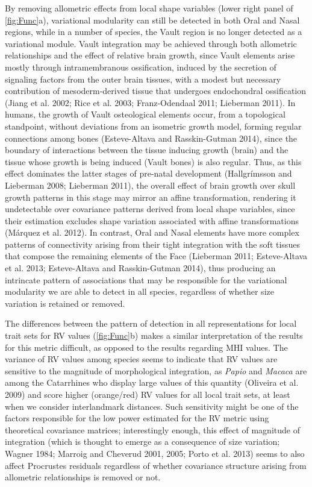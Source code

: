 \documentclass[12pt,]{article}
\begin{document}
By removing allometric effects from local shape variables (lower right
panel of \autoref{fig:Func}a), variational modularity can still be
detected in both Oral and Nasal regions, while in a number of species,
the Vault region is no longer detected as a variational module. Vault
integration may be achieved through both allometric relationships and
the effect of relative brain growth, since Vault elements arise mostly
through intramembranous ossification, induced by the secretion of
signaling factors from the outer brain tissues, with a modest but
necessary contribution of mesoderm-derived tissue that undergoes
endochondral ossification (Jiang et al. 2002; Rice et al. 2003;
Franz-Odendaal 2011; Lieberman 2011). In humans, the growth of Vault
osteological elements occur, from a topological standpoint, without
deviations from an isometric growth model, forming regular connections
among bones (Esteve-Altava and Rasskin-Gutman 2014), since the boundary
of interactions between the tissue inducing growth (brain) and the
tissue whose growth is being induced (Vault bones) is also regular.
Thus, as this effect dominates the latter stages of pre-natal
development (Hallgrímsson and Lieberman 2008; Lieberman 2011), the
overall effect of brain growth over skull growth patterns in this stage
may mirror an affine transformation, rendering it undetectable over
covariance patterns derived from local shape variables, since their
estimation excludes shape variation associated with affine
transformations (Márquez et al. 2012). In contrast, Oral and Nasal
elements have more complex patterns of connectivity arising from their
tight integration with the soft tissues that compose the remaining
elements of the Face (Lieberman 2011; Esteve-Altava et al. 2013;
Esteve-Altava and Rasskin-Gutman 2014), thus producing an intrincate
pattern of associations that may be responsible for the variational
modularity we are able to detect in all species, regardless of whether
size variation is retained or removed.

The differences between the pattern of detection in all representations
for local trait sets for RV values (\autoref{fig:Func}b) makes a similar
interpretation of the results for this metric difficult, as opposed to
the results regarding MHI values. The variance of RV values among
species seems to indicate that RV values are sensitive to the magnitude
of morphological integration, as \emph{Papio} and \emph{Macaca} are
among the Catarrhines who display large values of this quantity
(Oliveira et al. 2009) and score higher (orange/red) RV values for all
local trait sets, at least when we consider interlandmark distances.
Such sensitivity might be one of the factors responsible for the low
power estimated for the RV metric using theoretical covariance matrices;
interestingly enough, this effect of magnitude of integration (which is
thought to emerge as a consequence of size variation; Wagner 1984;
Marroig and Cheverud 2001, 2005; Porto et al. 2013) seems to also affect
Procrustes residuals regardless of whether covariance structure arising
from allometric relationships is removed or not.
\end{document}
